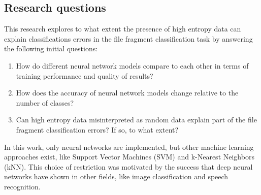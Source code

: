 \subsection{Research questions}
This research explores to what extent the presence of high entropy data can explain classifications errors in the file fragment classification task by answering the following initial questions:

\begin{enumerate}[itemindent=\parindent,label=\textbf{Q\arabic*.}]

    \item How do different neural network models compare to each other in terms of training performance and quality of results?
    
    \item How does the accuracy of neural network models change relative to the number of classes?

    \item Can high entropy data misinterpreted as random data explain part of the file fragment classification errors? If so, to what extent?

\end{enumerate}

In this work, only neural networks are implemented, but other machine learning approaches exist, like Support Vector Machines (SVM) and k-Nearest Neighbors (kNN). This choice of restriction was motivated by the success that deep neural networks have shown in other fields, like image classification and speech recognition.

